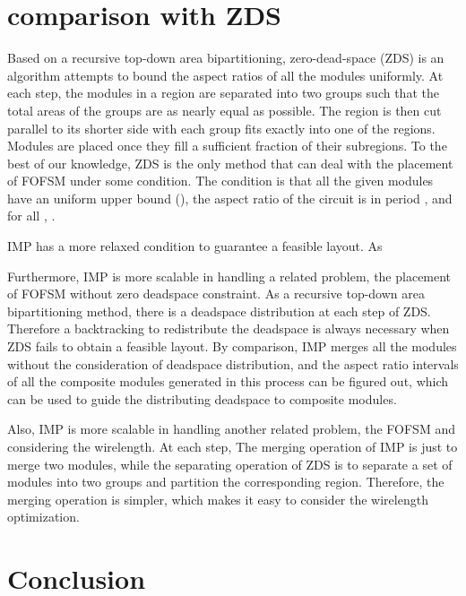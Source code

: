 \documentclass[conference]{IEEEtran}
\begin{document}
\section{comparison with ZDS}

Based on a recursive top-down area bipartitioning, zero-dead-space (ZDS) \cite{ZDS} is an algorithm attempts to bound the aspect ratios of all the modules uniformly. At each step, the modules in a region are separated into two groups such that the total areas of the groups are as nearly equal as possible. The region is then cut parallel to its shorter side with each group fits exactly into one of the regions. Modules are placed once they fill a sufficient fraction of their subregions. To the best of our knowledge, ZDS is the only method that can deal with the placement of FOFSM under some condition. The condition is that all the given modules have an uniform upper bound  (), the aspect ratio of the circuit  is in period , and for all , .

IMP has a more relaxed condition to guarantee a feasible layout. As




Furthermore, IMP is more scalable in handling a related problem, the placement of FOFSM without zero deadspace constraint. As a recursive top-down area bipartitioning method, there is a deadspace distribution at each step of ZDS. Therefore a backtracking to redistribute the deadspace is always necessary when ZDS fails to obtain a feasible layout. By comparison, IMP merges all the modules without the consideration of deadspace distribution, and the aspect ratio intervals of all the composite modules generated in this process can be figured out, which can be used to guide the distributing deadspace to composite modules.


Also, IMP is more scalable in handling another related problem, the FOFSM and considering the wirelength. At each step, The merging operation of IMP is just to merge two modules, while the separating operation of ZDS is to separate a set of modules into two groups and partition the corresponding region. Therefore, the merging operation is simpler, which makes it easy to consider the wirelength optimization.


\section{Conclusion}
\end{document}
